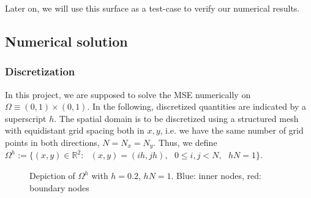 \documentclass[11pt]{scrartcl}
\begin{document}
Later on, we will use this surface as a test-case to verify our numerical results.

\newpage
\subsection{Numerical solution}
\subsubsection{Discretization}
In this project, we are supposed to solve the MSE numerically on $\Omega \equiv (0,1)\times(0,1)$. In the following, discretized quantities are indicated by a superscript $h$. The spatial domain is to be discretized using a structured mesh with equidistant grid spacing both in $x,y$, i.e. we have the same number of grid points in both directions, $N=N_x=N_y$. Thus, we define $\Omega^h := \{ (x,y) \in \mathbb{R}^2:\text{ }(x,y) = (ih, jh), \text{ } 0 \le i,j < N,\text{ }hN=1\}$.

\begin{figure}[h!]
	\centering
	\caption[Depiction of $\Omega^h$ with $N=5$, $hN=1$]{Depiction of $\Omega^h$ with $h=0.2$, $hN=1$. Blue: inner nodes, red: boundary nodes}
\end{figure}
\end{document}
